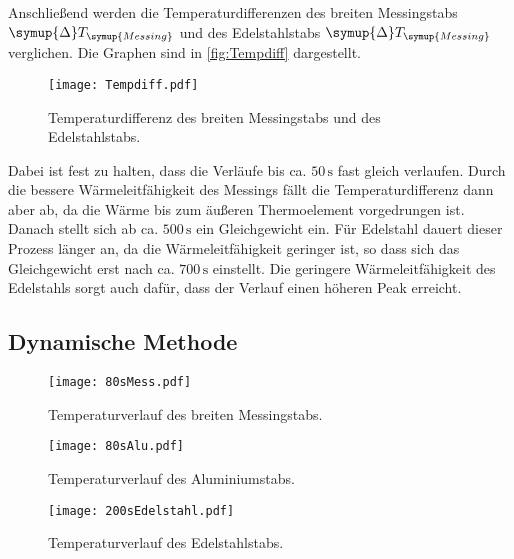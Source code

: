 Anschließend werden die Temperaturdifferenzen des breiten Messingstabs $\symup{\Delta}T_{\symup{Messing}}$ und des Edelstahlstabs $\symup{\Delta}T_{\symup{Messing}}$
verglichen. Die Graphen sind in \autoref{fig:Tempdiff} dargestellt.
\begin{figure}[h]
  \centering
  \texttt{[image: Tempdiff.pdf]}
  \caption{Temperaturdifferenz des breiten Messingstabs und des Edelstahlstabs.}
  \label{fig:Tempdiff}
\end{figure}
Dabei ist fest zu halten, dass die Verläufe bis ca. $50\,\si{\second}$ fast gleich verlaufen.
Durch die bessere Wärmeleitfähigkeit des Messings fällt die Temperaturdifferenz dann aber ab, da die Wärme bis zum äußeren Thermoelement vorgedrungen ist. Danach
stellt sich ab ca. $500\,\si{\second}$ ein Gleichgewicht ein. Für Edelstahl dauert dieser Prozess länger an, da die Wärmeleitfähigkeit geringer ist, so dass sich
das Gleichgewicht erst nach ca. $700\,\si{\second}$ einstellt. Die geringere Wärmeleitfähigkeit des Edelstahls sorgt auch dafür, dass der Verlauf einen höheren Peak
erreicht.

\subsection{Dynamische Methode}
\label{dynam}

\begin{figure}[h]
  \centering
  \texttt{[image: 80sMess.pdf]}
  \caption{Temperaturverlauf des breiten Messingstabs.}
  \label{fig:80sMess}
\end{figure}

\begin{figure}[h]
  \centering
  \texttt{[image: 80sAlu.pdf]}
  \caption{Temperaturverlauf des Aluminiumstabs.}
  \label{fig:80sAlu}
\end{figure}

\begin{figure}[h]
  \centering
  \texttt{[image: 200sEdelstahl.pdf]}
  \caption{Temperaturverlauf des Edelstahlstabs.}
  \label{fig:200sEdelstahl}
\end{figure}
